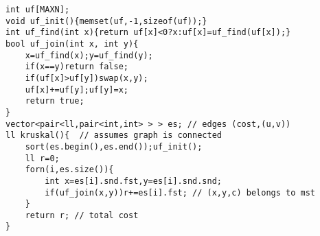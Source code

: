 \begin{verbatim}
int uf[MAXN];
void uf_init(){memset(uf,-1,sizeof(uf));}
int uf_find(int x){return uf[x]<0?x:uf[x]=uf_find(uf[x]);}
bool uf_join(int x, int y){
	x=uf_find(x);y=uf_find(y);
	if(x==y)return false;
	if(uf[x]>uf[y])swap(x,y);
	uf[x]+=uf[y];uf[y]=x;
	return true;
}
vector<pair<ll,pair<int,int> > > es; // edges (cost,(u,v))
ll kruskal(){  // assumes graph is connected
	sort(es.begin(),es.end());uf_init();
	ll r=0;
	forn(i,es.size()){
		int x=es[i].snd.fst,y=es[i].snd.snd;
		if(uf_join(x,y))r+=es[i].fst; // (x,y,c) belongs to mst
	}
	return r; // total cost
}
\end{verbatim}
